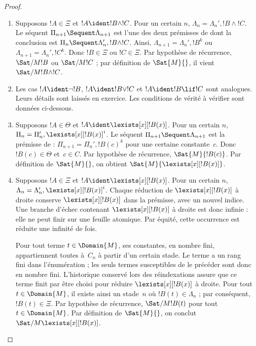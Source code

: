 \documentclass[../../../include/open-logic-section]{subfiles}
\begin{document}
\begin{proof}
\begin{enumerate}
  \item Supposons $!A \in \Xi$ et
  $!A \ident !B \land !C$. Pour un certain $n$,
  $\Lambda_n = \Lambda_n', !B \land !C$.
  Le séquent $\Pi_{n+1} \Sequent \Lambda_{n+1}$
  est l'une des deux prémisses de \RightR{\land}
  dont la conclusion est
  $\Pi_n \Sequent \Lambda'_n, !B \land !C$.
  Ainsi, $\Lambda_{n+1} = \Lambda_n', !B^k$
  ou $\Lambda_{n+1} = \Lambda_n', !C^k$.
  Donc $!B \in \Xi$ ou $!C \in \Xi$.
  Par hypothèse de récurrence, $\Sat/{M}{!B}$
  ou $\Sat/{M}{!C}$ ; par définition de
  $\Sat{M}{}$, il vient $\Sat/{M}{!B \land !C}$.

  \item Les cas $!A \ident \lnot !B$,
  $!A \ident !B \lor !C$ et $!A \ident !B \lif !C$
  sont analogues. Leurs détails sont laissés
  en exercice. Les conditions de vérité
  à vérifier sont données ci-dessous.

  \item Supposons $!A \in \Theta$ et
  $!A \ident \lexists[x][!B(x)]$.
  Pour un certain $n$,
  $\Pi_n = \Pi_n', \lexists[x][!B(x)]^i$.
  Le séquent $\Pi_{n+1} \Sequent \Lambda_{n+1}$
  est la prémisse de \LeftR{\lexists} :
  $\Pi_{n+1} = \Pi_n', !B(c)^k$
  pour une certaine constante~$c$.
  Donc $!B(c) \in \Theta$ et~$c \in C$.
  Par hypothèse de récurrence, $\Sat{M}{!B(c)}$.
  Par définition de $\Sat{M}{}$,
  on obtient $\Sat{M}{\lexists[x][!B(x)]}$.

  \item Supposons $!A \in \Xi$ et
  $!A \ident \lexists[x][!B(x)]$.
  Pour un certain $n$,
  $\Lambda_n = \Lambda_n', \lexists[x][!B(x)]^i$.
  Chaque réduction de $\lexists[x][!B(x)]$
  à droite conserve $\lexists[x][!B(x)]$
  dans la prémisse, avec un nouvel indice.
  Une branche d'échec contenant
  $\lexists[x][!B(x)]$ à droite est donc infinie :
  elle ne peut finir sur une feuille atomique.
  Par équité, cette occurrence est réduite
  une infinité de fois.

  Pour tout terme $t \in \Domain{M}$, ses
  constantes, en nombre fini, appartiennent
  toutes à~$C_n$ à partir d'un certain stade.
  Le terme a un rang fini dans l'énumération ;
  les seuls termes susceptibles de le précéder
  sont donc en nombre fini. L'historique
  conservé lors des réindexations assure que
  ce terme finit par être choisi pour réduire
  $\lexists[x][!B(x)]$ à droite.
  Pour tout $t \in \Domain{M}$, il existe ainsi
  un stade~$n$ où $!B(t) \in \Lambda_n$ ;
  par conséquent, $!B(t) \in \Xi$.
  Par hypothèse de récurrence,
  $\Sat/{M}{!B(t)}$ pour tout $t \in \Domain{M}$.
  Par définition de $\Sat{M}{}$,
  on conclut $\Sat/{M}{\lexists[x][!B(x)]}$.


\end{enumerate}
\end{proof}
\end{document}

